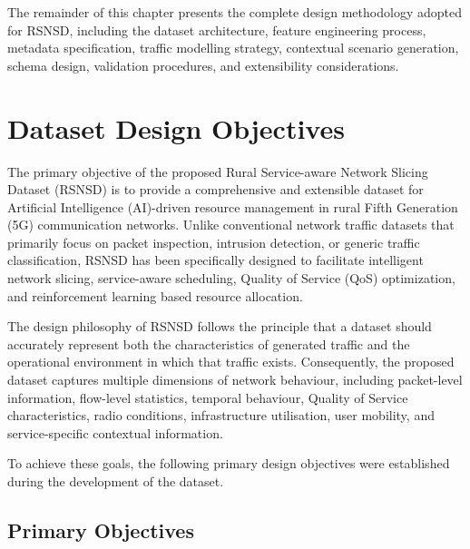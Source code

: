 \documentclass[12pt,a4paper]{article}
\begin{document}
The remainder of this chapter presents the complete design methodology adopted for RSNSD, including the dataset architecture, feature engineering process, metadata specification, traffic modelling strategy, contextual scenario generation, schema design, validation procedures, and extensibility considerations.

\section{Dataset Design Objectives}

The primary objective of the proposed Rural Service-aware Network Slicing Dataset (RSNSD) is to provide a comprehensive and extensible dataset for Artificial Intelligence (AI)-driven resource management in rural Fifth Generation (5G) communication networks. Unlike conventional network traffic datasets that primarily focus on packet inspection, intrusion detection, or generic traffic classification, RSNSD has been specifically designed to facilitate intelligent network slicing, service-aware scheduling, Quality of Service (QoS) optimization, and reinforcement learning based resource allocation.

The design philosophy of RSNSD follows the principle that a dataset should accurately represent both the characteristics of generated traffic and the operational environment in which that traffic exists. Consequently, the proposed dataset captures multiple dimensions of network behaviour, including packet-level information, flow-level statistics, temporal behaviour, Quality of Service characteristics, radio conditions, infrastructure utilisation, user mobility, and service-specific contextual information.

To achieve these goals, the following primary design objectives were established during the development of the dataset.

\subsection{Primary Objectives}
\end{document}
